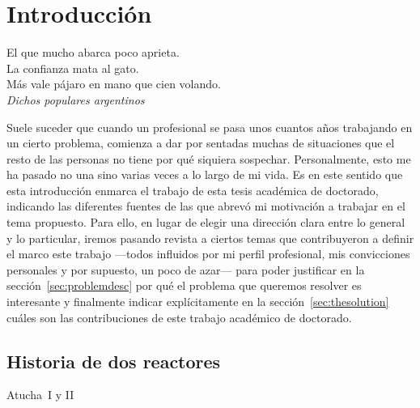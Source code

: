 \chapter{Introducción}
\label{cap:introduccion}

\begin{chapterquote}[0.87\linewidth]
El que mucho abarca poco aprieta.\\
La confianza mata al gato.\\
Más vale pájaro en mano que cien volando.\\
\smallskip
\textit{Dichos populares argentinos~\cite{chaco}}\\

\end{chapterquote}

\noindent
Suele suceder que cuando un profesional se pasa unos cuantos años trabajando en un cierto problema, comienza a dar por sentadas muchas de situaciones que el resto de las personas no tiene por qué siquiera sospechar. Personalmente, esto me ha pasado no una sino varias veces a lo largo de mi vida. Es en este sentido que esta introducción enmarca el trabajo de esta tesis académica de doctorado, indicando las diferentes fuentes de las que abrevó mi motivación a trabajar en el tema propuesto. Para ello, en lugar de elegir una dirección clara entre lo general y lo particular, iremos pasando revista a ciertos temas que contribuyeron a definir el marco este trabajo ---todos influidos por mi perfil profesional, mis convicciones personales y por supuesto, un poco de azar--- para poder justificar en la sección~\ref{sec:problemdesc} por qué el problema que queremos resolver es interesante y finalmente indicar explícitamente en la sección~\ref{sec:thesolution} cuáles son las contribuciones de este trabajo académico de doctorado.

\section{Historia de dos reactores} %

Atucha~I y II
\lipsum[1]

